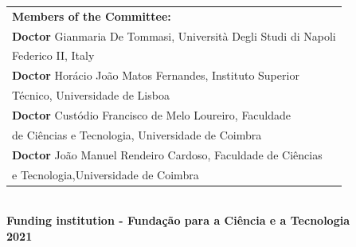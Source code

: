 {{\begin{tabular}{l}
		\FontM\textbf{Members of the Committee:}\\
		\hspace{0.5cm}\FontM	\textbf{Doctor} Gianmaria De Tommasi, Università Degli Studi di Napoli \\ 	\FontM \hspace{2.25cm} Federico II, Italy \\
		
		\hspace{0.5cm}\FontM \textbf{Doctor} Horácio João Matos Fernandes, Instituto Superior \\ \hspace{2.25cm} 	\FontM  Técnico, Universidade de Lisboa\\
		
		\hspace{0.5cm}\FontM	\textbf{Doctor} Custódio Francisco de Melo Loureiro,  Faculdade \\ \hspace{2.25cm} 	\FontM de  Ciências e Tecnologia,
		Universidade de Coimbra\\
		
		\hspace{0.5cm}\FontM	\textbf{Doctor} João Manuel Rendeiro Cardoso, Faculdade de Ciências \\ \hspace{2.25cm} 	\FontM  e Tecnologia,Universidade de Coimbra\\
		
		
\end{tabular} } \\

\vspace{0.5cm}
{\FontM \textbf{Funding institution - Fundação para a Ciência e a Tecnologia}}\\
\vspace{0.3cm}
{\FontM \textbf{2021}} \\

\endgroup}






